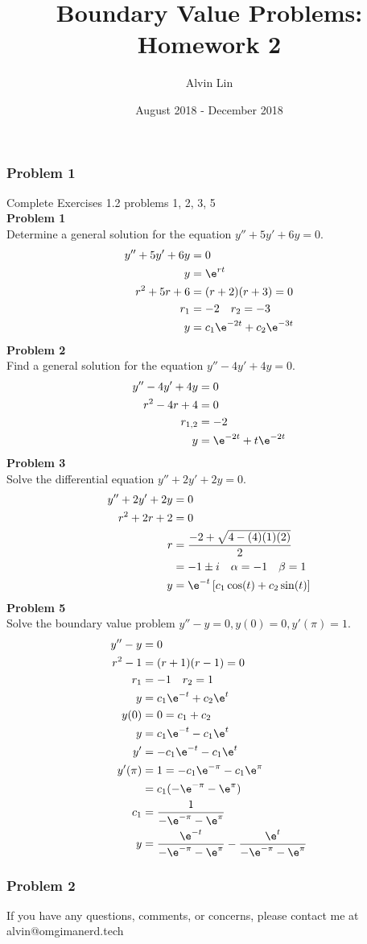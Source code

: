 \documentclass{math}
\title{Boundary Value Problems: Homework 2}
\author{Alvin Lin}
\date{August 2018 - December 2018}
\begin{document}
\maketitle

\subsubsection*{Problem 1}
Complete Exercises 1.2 problems 1, 2, 3, 5 \\
\textbf{Problem 1} \\
Determine a general solution for the equation \( y''+5y'+6y = 0 \).
\begin{align*}
  y''+5y'+6y &= 0 \\
  y &= \e^{rt} \\
  r^2+5r+6 &= (r+2)(r+3) = 0 \\
  r_1 &= -2 \quad r_2 = -3 \\
  y &= c_1\e^{-2t}+c_2\e^{-3t}
\end{align*}
\textbf{Problem 2} \\
Find a general solution for the equation \( y''-4y'+4y = 0 \).
\begin{align*}
  y''-4y'+4y &= 0 \\
  r^2-4r+4 &= 0 \\
  r_{1,2} &= -2 \\
  y &= \e^{-2t}+t\e^{-2t}
\end{align*}
\textbf{Problem 3} \\
Solve the differential equation \( y''+2y'+2y = 0 \).
\begin{align*}
  y''+2y'+2y &= 0 \\
  r^2+2r+2 &= 0 \\
  r &= \frac{-2+\sqrt{4-(4)(1)(2)}}{2} \\
  &= -1\pm i \quad \alpha = -1 \quad \beta = 1 \\
  y &= \e^{-t}\left[c_1\cos(t)+c_2\sin(t)\right]
\end{align*}
\textbf{Problem 5} \\
Solve the boundary value problem \( y''-y = 0, y(0) = 0, y'(\pi) = 1 \).
\begin{align*}
  y''-y &= 0 \\
  r^2-1 &= (r+1)(r-1) = 0 \\
  r_1 &= -1 \quad r_2 = 1 \\
  y &= c_1\e^{-t}+c_2\e^t \\
  y(0) &= 0 = c_1+c_2 \\
  y &= c_1\e^{-t}-c_1\e^t \\
  y' &= -c_1\e^{-t}-c_1\e^t \\
  y'(\pi) &= 1 = -c_1\e^{-\pi}-c_1\e^{\pi} \\
  &= c_1(-\e^{-\pi}-\e^{\pi}) \\
  c_1 &= \frac{1}{-\e^{-\pi}-\e^{\pi}} \\
  y &= \frac{\e^{-t}}{-\e^{-\pi}-\e^{\pi}}-\frac{\e^t}{-\e^{-\pi}-\e^{\pi}}
\end{align*}

\subsubsection*{Problem 2}

\begin{center}
  If you have any questions, comments, or concerns, please contact me at
  alvin@omgimanerd.tech
\end{center}
\end{document}
